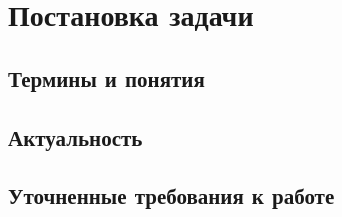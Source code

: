
\chapter{Постановка задачи}
\section{Термины и понятия}
\section{Актуальность}
\section{Уточненные требования к работе}
\chapterconclusion
    
